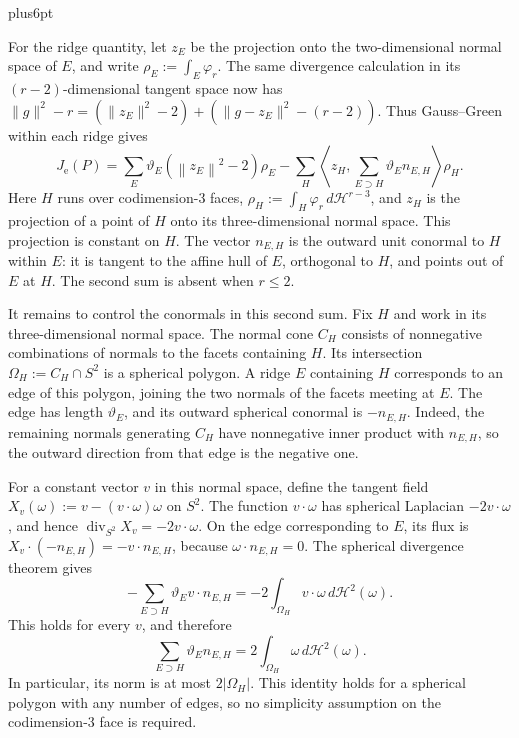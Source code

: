 \documentclass[11pt,letterpaper,twoside,leqno]{article}
\makeatletter
\theoremstyle{bookplain}
\theoremstyle{bookremark}
\renewenvironment{proof}[1][\proofname]{\par
  \pushQED{\qed}\normalfont\topsep6pt plus6pt\relax
  \trivlist\item[\hskip\labelsep\bfseries #1\@addpunct{.}]\ignorespaces
}{\popQED\endtrivlist\@endpefalse}
\newcommand{\norm}[1]{\left\lVert#1\right\rVert}
\newcommand{\dd}{\,d}
\makeatother
\begin{document}
\begin{proof}
For the ridge quantity, let $z_E$ be the projection onto the
two-dimensional normal space of $E$, and write $\rho_E:=\int_E\varphi_r$.
The same divergence calculation in its $(r-2)$-dimensional tangent
space now has $\|g\|^2-r=(\|z_E\|^2-2)
 +(\|g-z_E\|^2-(r-2))$. Thus Gauss--Green within each ridge gives
\begin{equation}
 J_{\mathrm e}(P)
 =\sum_E\vartheta_E(\norm{z_E}^2-2)\rho_E
 -\sum_H\left\langle z_H,
        \sum_{E\supset H}\vartheta_E n_{E,H}\right\rangle\rho_H.
 \label{hgap:eq:edge-identity}
\end{equation}
Here $H$ runs over codimension-$3$ faces,
$\rho_H:=\int_H\varphi_r\dd\mathcal H^{r-3}$, and $z_H$ is the
projection of a point of $H$ onto its three-dimensional normal space.
This projection is constant on $H$. The vector $n_{E,H}$ is the
outward unit conormal to $H$ within $E$: it is tangent to the affine
hull of $E$, orthogonal to $H$, and points out of $E$ at $H$.
The second sum is absent when $r\le2$.

It remains to control the conormals in this second sum. Fix $H$ and
work in its three-dimensional normal space. The normal cone
$C_H$ consists of nonnegative combinations of normals to the facets
containing $H$. Its intersection $\Omega_H:=C_H\cap S^2$ is a spherical
polygon. A ridge $E$ containing $H$ corresponds to an edge of this
polygon, joining the two normals of the facets meeting at $E$.
The edge has length $\vartheta_E$, and its outward spherical conormal
is $-n_{E,H}$. Indeed, the remaining normals generating $C_H$ have
nonnegative inner product with $n_{E,H}$, so the outward direction
from that edge is the negative one.

For a constant vector $v$ in this normal space, define the tangent
field $X_v(\omega):=v-(v\cdot\omega)\omega$ on $S^2$.
The function $v\cdot\omega$ has spherical Laplacian
$-2v\cdot\omega$, and hence
$\operatorname{div}_{S^2}X_v=-2v\cdot\omega$.
On the edge corresponding to $E$, its flux is
$X_v\cdot(-n_{E,H})=-v\cdot n_{E,H}$, because
$\omega\cdot n_{E,H}=0$. The spherical divergence theorem gives
\[
 -\sum_{E\supset H}\vartheta_E v\cdot n_{E,H}
 =-2\int_{\Omega_H}v\cdot\omega\dd\mathcal H^2(\omega).
\]
This holds for every $v$, and therefore
\begin{equation}
 \sum_{E\supset H}\vartheta_E n_{E,H}
 =2\int_{\Omega_H}\omega\dd\mathcal H^2(\omega).
 \label{hgap:eq:spherical-balance}
\end{equation}
In particular, its norm is at most $2|\Omega_H|$. This identity holds
for a spherical polygon with any number of edges, so no simplicity
assumption on the codimension-$3$ face is required.


\end{proof}
\end{document}
